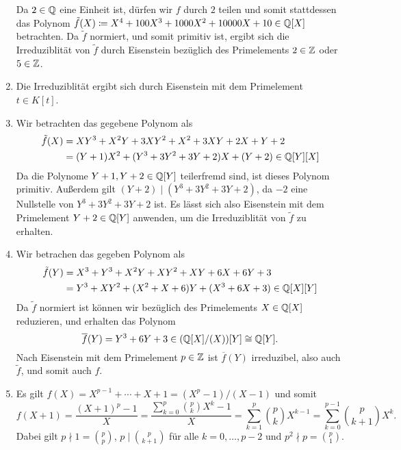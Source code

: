\begin{solution}
\begin{enumerate}
      Da $2 \in \mathbb{Q}$ eine Einheit ist, dürfen wir $f$ durch $2$ teilen und somit stattdessen das Polynom $\tilde{f}(X) \coloneqq X^4 + 100 X^3 + 1000 X^2 + 10000 X + 10 \in \mathbb{Q}[X]$ betrachten.
      Da $\tilde{f}$ normiert, und somit primitiv ist, ergibt sich die Irreduziblität von $\tilde{f}$ durch Eisenstein bezüglich des Primelements $2 \in \mathbb{Z}$ oder $5 \in \mathbb{Z}$.
    \item
      Die Irreduziblität ergibt sich durch Eisenstein mit dem Primelement $t \in K[t]$.
    \item
      Wir betrachten das gegebene Polynom als
      \begin{align*}
            \tilde{f}(X)
        &=  X Y^3 + X^2 Y + 3 X Y^2 + X^2 + 3 X Y + 2 X + Y + 2
        \\
        &=  (Y + 1) X^2 + (Y^3 + 3 Y^2 + 3 Y + 2) X + (Y + 2)
        \in \mathbb{Q}[Y][X]
      \end{align*}
      Da die Polynome $Y+1, Y + 2 \in \mathbb{Q}[Y]$ teilerfremd sind, ist dieses Polynom primitiv.
      Außerdem gilt $(Y + 2) \mid (Y^3 + 3 Y^2 + 3 Y + 2)$, da $-2$ eine Nullstelle von $Y^3 + 3 Y^2 + 3 Y + 2$ ist.
      Es lässt sich also Eisenstein mit dem Primelement $Y + 2 \in \mathbb{Q}[Y]$ anwenden, um die Irreduziblität von $\tilde{f}$ zu erhalten.
    \item
      Wir betrachen das gegeben Polynom als
      \begin{align*}
            \tilde{f}(Y)
        &=  X^3 + Y^3 + X^2 Y + X Y^2 + X Y + 6 X + 6 Y + 3
        \\
        &=  Y^3 + X Y^2 + (X^2 + X + 6) Y + (X^3 + 6X + 3)
        \in \mathbb{Q}[X][Y]
      \end{align*}
      Da $\tilde{f}$ normiert ist können wir bezüglich des Primelements $X \in \mathbb{Q}[X]$ reduzieren, und erhalten das Polynom
      \[
              \overline{f}(Y)
        =     Y^3 + 6 Y + 3
        \in   (\mathbb{Q}[X]/(X))[Y]
        \cong \mathbb{Q}[Y].
      \]
      Nach Eisenstein mit dem Primelement $p \in \mathbb{Z}$ ist $\overline{f}(Y)$ irreduzibel, also auch $\tilde{f}$, und somit auch $f$.
    \item
      Es gilt $f(X) = X^{p-1} + \dotsb + X + 1 = (X^p - 1)/(X - 1)$ und somit
      \[
          f(X+1)
        = \frac{(X+1)^p-1}{X}
        = \frac{\sum_{k=0}^p \binom{p}{k} X^k - 1}{X}
        = \sum_{k=1}^p \binom{p}{k} X^{k-1}
        = \sum_{k=0}^{p-1} \binom{p}{k+1} X^k.
      \]
      Dabei gilt $p \nmid 1 = \binom{p}{p}$, $p \mid \binom{p}{k+1}$ für alle $k = 0, \dotsc, p-2$ und $p^2 \nmid p = \binom{p}{1}$.

\end{enumerate}
\end{solution}
